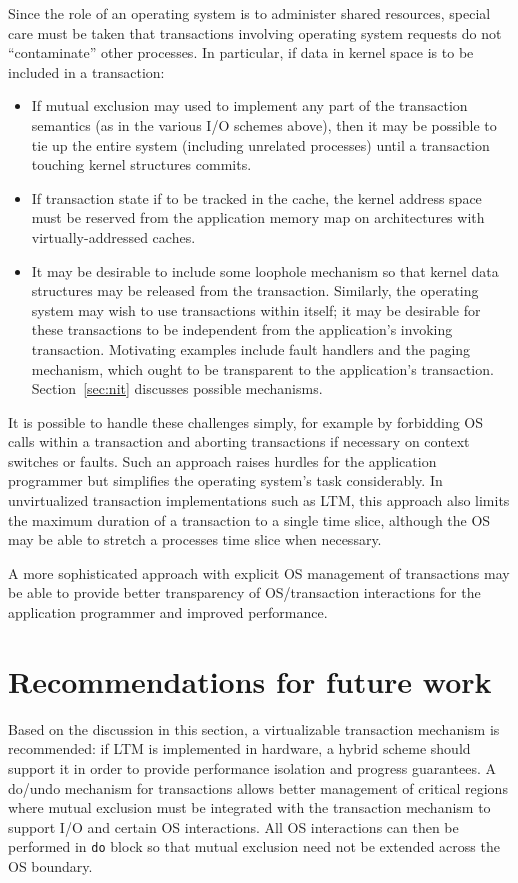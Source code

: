Since the role of an operating system is to administer shared
resources, special care must be taken that transactions involving
operating system requests do not ``contaminate'' other processes.
In particular, if data in kernel space is to be included in a
transaction:
\begin{itemize}
\item If mutual exclusion may used to implement any part of the
transaction semantics (as in the various I/O schemes above), then it
may be possible to tie up the entire system (including unrelated
processes) until a transaction touching kernel structures commits.
\item If transaction state if to be tracked in the cache, the
kernel address space must be reserved from the application memory map
 on architectures with virtually-addressed caches.
\item It may be desirable to include some loophole mechanism
 so that kernel data structures may be released from the transaction.
 Similarly, the operating system may wish to use transactions within
 itself; it may be desirable for these transactions to be independent
 from the application's invoking transaction.  Motivating examples
 include fault handlers and the paging mechanism, which ought to be
 transparent to the application's transaction.  Section~\ref{sec:nit}
 discusses possible mechanisms.
\end{itemize}

It is possible to handle these challenges simply, for example by
forbidding OS calls within a transaction and aborting transactions if
necessary on context switches or faults.  Such an approach raises
hurdles for the application programmer but simplifies the operating
system's task considerably.  In unvirtualized transaction
implementations such as LTM, this approach also limits the maximum
duration of a transaction to a single time slice, although the OS may
be able to stretch a processes time slice when necessary.

A more sophisticated approach with explicit OS management of
transactions may be able to provide better transparency of
OS/transaction interactions for the application programmer and
improved performance.

\section{Recommendations for future work}
Based on the discussion in this section, a virtualizable transaction
mechanism is recommended: if LTM is implemented in hardware, a hybrid
scheme should support it in order to provide performance isolation and
progress guarantees.  A do/undo mechanism for transactions allows
better management of critical regions where mutual exclusion must be
integrated with the transaction mechanism to support I/O and certain
OS interactions.  All OS interactions can then be performed in
\texttt{do} block so that mutual exclusion need not be extended across
the OS boundary.

